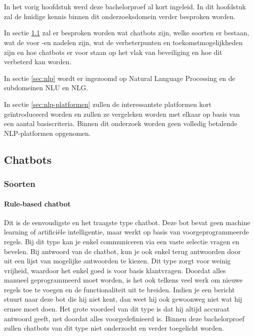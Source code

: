 \chapter{}
\label{ch:stand-van-zaken}

In het vorig hoofdstuk werd deze bachelorproef al kort ingeleid. In dit hoofdstuk zal de huidige kennis binnen dit onderzoeksdomein verder besproken worden.

In sectie \ref{sec:chatbots} zal er besproken worden wat chatbots zijn, welke soorten er bestaan, wat de voor -en nadelen zijn, wat de verbeterpunten en toekomstmogelijkheden zijn en hoe chatbots er voor staan op het vlak van beveiliging en hoe dit verbeterd kan worden.

In sectie \ref{sec:nlp} wordt er ingezoomd op Natural Language Processing en de subdomeinen NLU en NLG.

In sectie \ref{sec:nlp-platformen} zullen de interessantste platformen kort geïntroduceerd worden en zullen ze vergeleken worden met elkaar op basis van een aantal basiscriteria. Binnen dit onderzoek worden geen volledig betalende NLP-platformen opgenomen.

\newpage
\section{Chatbots}
\label{sec:chatbots}

\subsection{Soorten}
\label{subsec:soorten}

\subsubsection{Rule-based chatbot}
\label{subsubsec:chatbots-soorten-rule-based-chatbot}

Dit is de eenvoudigste en het traagste type chatbot. Deze bot bevat geen machine learning of artificiële intelligentie, maar werkt op basis van voorgeprogrammeerde regels. Bij dit type kan je enkel communiceren via een vaste selectie vragen en bevelen. Bij antwoord van de chatbot, kun je ook enkel terug antwoorden door uit een lijst van mogelijke antwoorden te kiezen. Dit type zorgt voor weinig vrijheid, waardoor het enkel goed is voor basis klantvragen. Doordat alles manueel geprogrammeerd moet worden, is het ook telkens veel werk om nieuwe regels toe te voegen en de functionaliteit uit te breiden. Indien je een bericht stuurt naar deze bot die hij niet kent, dan weet hij ook gewoonweg niet wat hij ermee moet doen. Het grote voordeel van dit type is dat hij altijd accuraat antwoord geeft, net doordat alles voorgedefinieerd is. Binnen deze bachelorproef zullen chatbots van dit type niet onderzocht en verder toegelicht worden.

